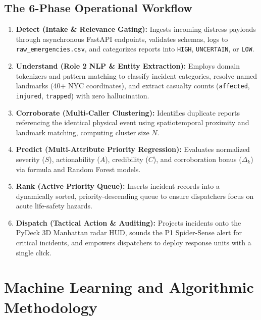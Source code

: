 \documentclass[10pt,a4paper]{article}
\begin{document}
\subsection{The 6-Phase Operational Workflow}
\begin{enumerate}
  \item \textbf{Detect (Intake \& Relevance Gating):} Ingests incoming distress payloads through asynchronous FastAPI endpoints, validates schemas, logs to \texttt{raw\_emergencies.csv}, and categorizes reports into \texttt{HIGH}, \texttt{UNCERTAIN}, or \texttt{LOW}.
  \item \textbf{Understand (Role 2 NLP \& Entity Extraction):} Employs domain tokenizers and pattern matching to classify incident categories, resolve named landmarks (40+ NYC coordinates), and extract casualty counts (\texttt{affected}, \texttt{injured}, \texttt{trapped}) with zero hallucination.
  \item \textbf{Corroborate (Multi-Caller Clustering):} Identifies duplicate reports referencing the identical physical event using spatiotemporal proximity and landmark matching, computing cluster size $N$.
  \item \textbf{Predict (Multi-Attribute Priority Regression):} Evaluates normalized severity ($S$), actionability ($A$), credibility ($C$), and corroboration bonus ($\Delta_k$) via formula and Random Forest models.
  \item \textbf{Rank (Active Priority Queue):} Inserts incident records into a dynamically sorted, priority-descending queue to ensure dispatchers focus on acute life-safety hazards.
  \item \textbf{Dispatch (Tactical Action \& Auditing):} Projects incidents onto the PyDeck 3D Manhattan radar HUD, sounds the P1 Spider-Sense alert for critical incidents, and empowers dispatchers to deploy response units with a single click.
\end{enumerate}


\section{Machine Learning and Algorithmic Methodology}
\end{document}
